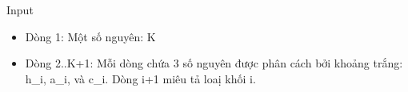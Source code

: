 Input
\begin{itemize}
	\item Dòng 1: Một số nguyên: K
	\item Dòng 2..K+1: Mỗi dòng chứa 3 số nguyên được phân cách bởi khoảng trắng: h\_i, a\_i, và c\_i. Dòng i+1 miêu tả loaị khối i.
\end{itemize}